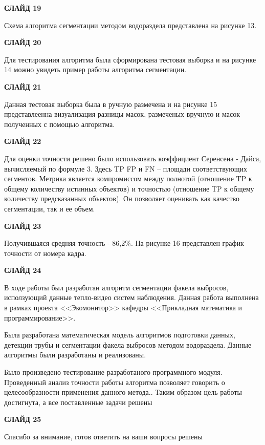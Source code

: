\documentclass[14pt, a4paper]{extreport}
\begin{document}
	\textbf{СЛАЙД 19}
	 
	 Схема алгоритма сегментации методом водораздела представлена на рисунке 13.
	 
	 \textbf{СЛАЙД 20}
	 
	 Для тестирования алгоритма была сформирована тестовая выборка и на рисунке 14 можно увидеть пример работы алгоритма сегментации.
	 
	 \textbf{СЛАЙД 21}
	 
	 Данная тестовая выборка была в ручную размечена и на рисунке 15 представлеенна визуализация разницы масок, размеченых вручную и масок полученных с помощью алгоритма.
	 
	 \textbf{СЛАЙД 22}
	 
	 Для оценки точности решено было использовать коэффициент Серенсена - Дайса, вычисляемый по формуле 3. Здесь TP FP и FN -- площади соответствующих сегментов. Метрика является компромиссом между полнотой (отношение TP к общему количеству истинных объектов) и точностью (отношение TP к общему количеству предсказанных объектов). Он позволяет оценивать как качество сегментации, так и ее объем.
	 
	 \textbf{СЛАЙД 23}
	 
	 Получившаяся средняя точность - 86,2\%. На рисунке 16 представлен график точности от номера кадра.
	 
	 \textbf{СЛАЙД 24}
	 
	 В ходе работы был разработан алгоритм сегментации факела выбросов, исползующий данные тепло-видео систем наблюдения. Данная работа выполнена в рамках проекта <<Экомонитор>> кафедры <<Прикладная математика и программирование>>.
	 
	 Была разработана математическая модель алгоритмов подготовки данных, детекции трубы и сегментации факела выбросов методом водораздела. Данные алгоритмы были разработаны и реализованы.

	 Было произведено тестирование разработаного программного модуля. Проведенный анализ точности работы алгоритма позволяет говорить о целесообразности применения данного метода.. Таким образом цель работы достигнута, а все поставленные задачи
	 решены
	 
	 \textbf{СЛАЙД 25}
	 
	 Спасибо за внимание, готов ответить на ваши вопросы
	 решены
\end{document}

